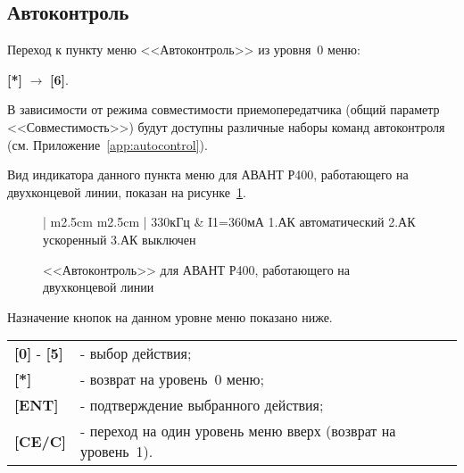 \subsection{Автоконтроль}	\label{ssec:autocontrol}

Переход к пункту меню <<Автоконтроль>> из уровня~0 меню: 

\textbf{[*]} $\rightarrow$ \textbf{[6]}.

В зависимости от режима совместимости приемопередатчика (общий параметр <<Совместимость>>) будут доступны различные наборы команд автоконтроля (см. Приложение~\ref{app:autocontrol}). 


Вид индикатора данного пункта меню для АВАНТ Р400, работающего на двухконцевой линии, показан на рисунке~\ref{fig:autocontrol}.
 
\begin{figure}[H]
	\centering
	
	\begin{tabular}{| m{2.5cm}  m{2.5cm} |}
		\firsthline
		330кГц	& \raggedleft I1=360мА				\tabularnewline 
		 {1.АК автоматический}	\tabularnewline 
		 {2.АК ускоренный}		\tabularnewline 
		 {3.АК выключен}	 	\tabularnewline \hline
		\lasthline
	\end{tabular} 
	
	\caption{<<Автоконтроль>> для АВАНТ Р400, работающего на двухконцевой линии}
	\label{fig:autocontrol}
\end{figure}

Назначение кнопок на данном уровне меню показано ниже.
\begin{center}
	\begin{tabular}{p{2cm} p{15cm}}
		\textbf{[0]} - \textbf{[5]} & - выбор действия; \tabularnewline 
		\textbf{[*]} 	& - возврат на уровень~0 меню; \tabularnewline
		\textbf{[ENT]} 	& - подтверждение выбранного действия; \tabularnewline
		\textbf{[CE/C]} & - переход на один уровень меню вверх (возврат на уровень~1). \tabularnewline				
	\end{tabular} 
\end{center}